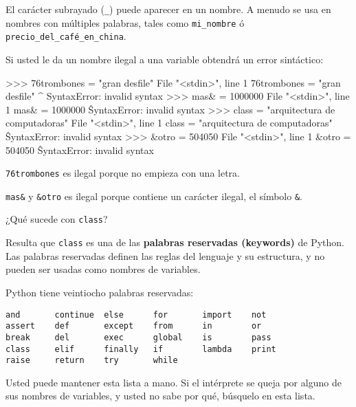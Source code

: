 El carácter subrayado (\texttt{\_}) puede aparecer en un nombre. A menudo
se usa en nombres con múltiples palabras, tales como 
\texttt{mi\_nombre} ó \texttt{precio\_del\_café\_en\_china}.


Si usted le da un nombre ilegal a una variable obtendrá un error sintáctico:

\beforeverb
\begin{pyconcode}
>>> 76trombones = "gran desfile"
  File "<stdin>", line 1
    76trombones = "gran desfile"
              ^
SyntaxError: invalid syntax
>>> mas& = 1000000
  File "<stdin>", line 1
    mas& = 1000000
       \^
SyntaxError: invalid syntax
>>> class  = "arquitectura de computadoras"
  File "<stdin>", line 1
    class  = "arquitectura de computadoras"
           \^
SyntaxError: invalid syntax
>>> &otro = 504050
  File "<stdin>", line 1
    &otro = 504050
    \^
SyntaxError: invalid syntax
\end{pyconcode}
\afterverb
%

\texttt{76trombones} es ilegal porque no empieza con una letra.

\texttt{mas\&} y \texttt{\&otro} es ilegal porque contiene un carácter ilegal, 
el símbolo \texttt{\&}. 

¿Qué sucede con \texttt{class}?

Resulta que \texttt{class} es una de las {\bf palabras reservadas (keywords)}
de Python.
Las palabras reservadas definen las reglas del lenguaje y su estructura, y no 
pueden ser usadas como nombres de variables.


Python tiene veintiocho palabras reservadas:

\begin{center}
\beforeverb
\begin{verbatim}
and       continue  else      for       import    not       
assert    def       except    from      in        or        
break     del       exec      global    is        pass      
class     elif      finally   if        lambda    print     
raise     return    try       while
\end{verbatim}
\afterverb
\end{center}%

Usted puede mantener esta lista a mano. Si el intérprete se queja 
por alguno de sus nombres de variables, y usted no sabe por qué,
búsquelo en esta lista.

